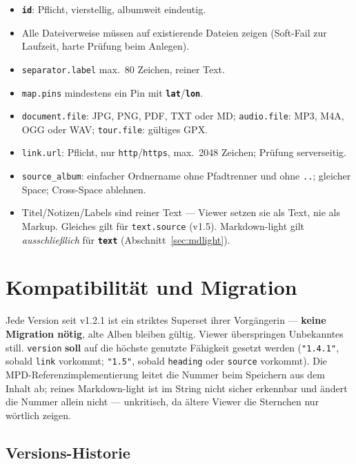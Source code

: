 \documentclass[11pt,a4paper]{article}
\let\mpdtt\texttt
\renewcommand{\texttt}[1]{\mpdtt{\textcolor{mpdred}{#1}}}
\newcommand{\feld}[1]{\mpdtt{\textbf{\textcolor{mpdred}{#1}}}}
\begin{document}
\begin{itemize}
  \item \feld{id}: Pflicht, vierstellig, albumweit eindeutig.
  \item Alle Dateiverweise müssen auf existierende Dateien zeigen
        (Soft-Fail zur Laufzeit, harte Prüfung beim Anlegen).
  \item \texttt{separator.label} max.\ 80 Zeichen, reiner Text.
  \item \texttt{map.pins} mindestens ein Pin mit \feld{lat}/\feld{lon}.
  \item \texttt{document.file}: JPG, PNG, PDF, TXT oder MD; \texttt{audio.file}:
        MP3, M4A, OGG oder WAV; \texttt{tour.file}: gültiges GPX.
  \item \texttt{link.url}: Pflicht, nur \texttt{http}/\texttt{https},
        max.\ 2048 Zeichen; Prüfung serverseitig.
  \item \texttt{source\_album}: einfacher Ordnername ohne Pfadtrenner
        und ohne \texttt{..}; gleicher Space; Cross-Space ablehnen.
  \item Titel/Notizen/Labels sind reiner Text — Viewer setzen sie als
        Text, nie als Markup. Gleiches gilt für \texttt{text.source}
        (v1.5). Markdown-light gilt \emph{ausschließlich} für
        \feld{text} (Abschnitt~\ref{sec:mdlight}).
\end{itemize}

\section{Kompatibilität und Migration}

Jede Version seit v1.2.1 ist ein striktes Superset ihrer Vorgängerin —
\textbf{keine Migration nötig}, alte Alben bleiben gültig. Viewer
überspringen Unbekanntes still. \texttt{version} \textbf{soll} auf die
höchste genutzte Fähigkeit gesetzt werden (\texttt{"1.4.1"}, sobald
\texttt{link} vorkommt; \texttt{"1.5"}, sobald \texttt{heading} oder
\texttt{source} vorkommt). Die MPD-Referenzimplementierung leitet die
Nummer beim Speichern aus dem Inhalt ab; reines Markdown-light ist im
String nicht sicher erkennbar und ändert die Nummer allein nicht —
unkritisch, da ältere Viewer die Sternchen nur wörtlich zeigen.

\subsection*{Versions-Historie}
\end{document}
